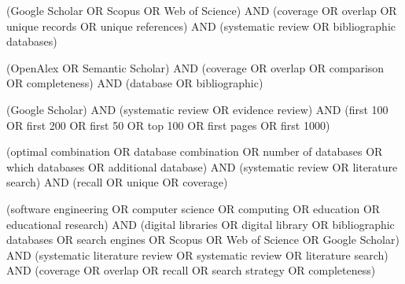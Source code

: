 \begin{description}[style=nextline,font=\normalfont\bfseries]
\item[q3a, support query] {\footnotesize\ttfamily\raggedright (\textquotedbl{}Google Scholar\textquotedbl{} OR Scopus OR \textquotedbl{}Web of Science\textquotedbl{}) AND (coverage OR overlap OR \textquotedbl{}unique records\textquotedbl{} OR \textquotedbl{}unique references\textquotedbl{}) AND (\textquotedbl{}systematic review\textquotedbl{} OR \textquotedbl{}bibliographic databases\textquotedbl{})\par}
\item[q3b, support query] {\footnotesize\ttfamily\raggedright (OpenAlex OR \textquotedbl{}Semantic Scholar\textquotedbl{}) AND (coverage OR overlap OR comparison OR completeness) AND (database OR bibliographic)\par}
\item[q3c, support query] {\footnotesize\ttfamily\raggedright (\textquotedbl{}Google Scholar\textquotedbl{}) AND (\textquotedbl{}systematic review\textquotedbl{} OR \textquotedbl{}evidence review\textquotedbl{}) AND (\textquotedbl{}first 100\textquotedbl{} OR \textquotedbl{}first 200\textquotedbl{} OR \textquotedbl{}first 50\textquotedbl{} OR \textquotedbl{}top 100\textquotedbl{} OR \textquotedbl{}first pages\textquotedbl{} OR \textquotedbl{}first 1000\textquotedbl{})\par}
\item[q3d, support query] {\footnotesize\ttfamily\raggedright (\textquotedbl{}optimal combination\textquotedbl{} OR \textquotedbl{}database combination\textquotedbl{} OR \textquotedbl{}number of databases\textquotedbl{} OR \textquotedbl{}which databases\textquotedbl{} OR \textquotedbl{}additional database\textquotedbl{}) AND (\textquotedbl{}systematic review\textquotedbl{} OR \textquotedbl{}literature search\textquotedbl{}) AND (recall OR unique OR coverage)\par}
\item[q3e, support query] {\footnotesize\ttfamily\raggedright (\textquotedbl{}software engineering\textquotedbl{} OR \textquotedbl{}computer science\textquotedbl{} OR computing OR education OR \textquotedbl{}educational research\textquotedbl{}) AND (\textquotedbl{}digital libraries\textquotedbl{} OR \textquotedbl{}digital library\textquotedbl{} OR \textquotedbl{}bibliographic databases\textquotedbl{} OR \textquotedbl{}search engines\textquotedbl{} OR Scopus OR \textquotedbl{}Web of Science\textquotedbl{} OR \textquotedbl{}Google Scholar\textquotedbl{}) AND (\textquotedbl{}systematic literature review\textquotedbl{} OR \textquotedbl{}systematic review\textquotedbl{} OR \textquotedbl{}literature search\textquotedbl{}) AND (coverage OR overlap OR recall OR \textquotedbl{}search strategy\textquotedbl{} OR completeness)\par}

\end{description}
